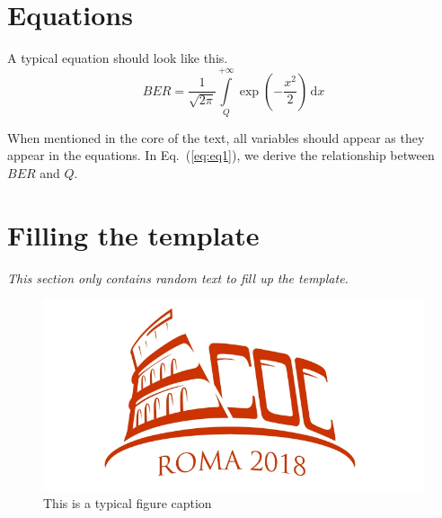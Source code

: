 \documentclass[a4paper, oneside, twocolumn, notitlepage, 10pt]{extarticle_ecoc}
\begin{document}
\section{Equations}
A typical equation should look like this. 
\begin{equation}\label{eq:eq1}
BER=\frac{1}{\sqrt{2\pi}}\int\limits_{Q}^{+\infty}\exp{\left(-\frac{x^2}{2}\right)}\,\mathrm{d}x
\end{equation}

When mentioned in the core of the text, all variables should appear as they appear in the equations. In Eq.~(\ref{eq:eq1}), we derive the relationship between $BER$ and $Q$. 


\section{Filling the template}

{\it This section only contains random text to fill up the
template.}


\begin{figure}[t]
   \centering
        \includegraphics[width=140mm]{fig1}
    \caption{This is a typical figure caption}
    \label{fig:figure2}
\end{figure}
\end{document}
